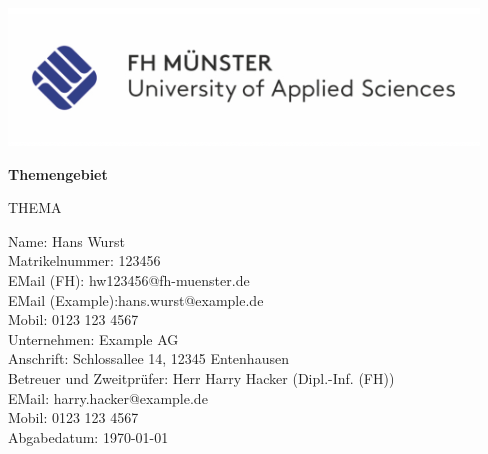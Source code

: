 \newenvironment{changemargin}[2]{ %

\begin{list}{}{%
\setlength{\topsep}{0pt}%
\setlength{\leftmargin}{#1}%
\setlength{\rightmargin}{#2}%
\setlength{\listparindent}{\parindent}%
\setlength{\itemindent}{\parindent}%
\setlength{\parsep}{\parskip}%
}%
\item[]}{\end{list}}

\begin{center}
\includegraphics[scale=1.2]{img/fh_logo.png}
\\[3cm]
\end{center}

\begin{center}
\textbf{\Large{ Themengebiet \\[1cm]}}
\end{center}

\begin{center}
\large{THEMA \\[4cm]}
\end{center}

\begin{small}
Name: Hans Wurst \\ 
Matrikelnummer: 123456\\
EMail (FH): hw123456@fh-muenster.de \\
EMail (Example):hans.wurst@example.de \\
Mobil: 0123 123 4567
\\[1cm]
Unternehmen: Example AG \\
Anschrift: Schlossallee 14, 12345 Entenhausen\\
Betreuer und Zweitprüfer: Herr Harry Hacker (Dipl.-Inf. (FH)) \\
EMail: harry.hacker@example.de \\
Mobil: 0123 123 4567
\\[1cm]
Abgabedatum: \today \\
\end{small}

